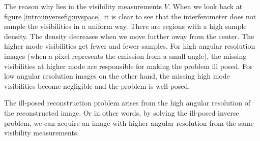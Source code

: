 The reason why lies in the visibility measurements $V$. When we look back at figure \ref{intro:inversefig:uvspace}, it is clear to see that the interferometer does not sample the visibilities in a uniform way. There are regions with a high sample density. The density decreases when we move further away from the center. The higher mode visibilities get fewer and fewer samples. For high angular resolution images (when a pixel represents the emission from a small angle), the missing visibilities at higher mode are responsible for making the problem ill posed. For low angular resolution images on the other hand, the missing high mode visibilities become negligible and the problem is well-posed. 

The ill-posed reconstruction problem arises from the high angular resolution of the reconstructed image. Or in other words, by solving the ill-posed inverse problem, we can acquire an image with higher angular resolution from the same visibility measurements.




